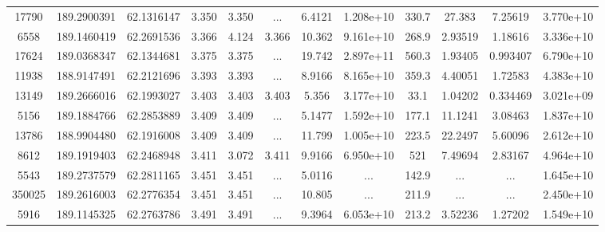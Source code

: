 \begin{table*}
\begin{tabular}{cccccccccccc}
          17790 &     189.2900391 &      62.1316147 &           3.350 &           3.350 &             ... &          6.4121 &       1.208e+10 &           330.7 &          27.383 &         7.25619 &       3.770e+10 \\
           6558 &     189.1460419 &      62.2691536 &           3.366 &           4.124 &           3.366 &          10.362 &       9.161e+10 &           268.9 &         2.93519 &         1.18616 &       3.336e+10 \\
          17624 &     189.0368347 &      62.1344681 &           3.375 &           3.375 &             ... &          19.742 &       2.897e+11 &           560.3 &         1.93405 &        0.993407 &       6.790e+10 \\
          11938 &     188.9147491 &      62.2121696 &           3.393 &           3.393 &             ... &          8.9166 &       8.165e+10 &           359.3 &         4.40051 &         1.72583 &       4.383e+10 \\
          13149 &     189.2666016 &      62.1993027 &           3.403 &           3.403 &           3.403 &           5.356 &       3.177e+10 &            33.1 &         1.04202 &        0.334469 &       3.021e+09 \\
           5156 &     189.1884766 &      62.2853889 &           3.409 &           3.409 &             ... &          5.1477 &       1.592e+10 &           177.1 &         11.1241 &         3.08463 &       1.837e+10 \\
          13786 &     188.9904480 &      62.1916008 &           3.409 &           3.409 &             ... &          11.799 &       1.005e+10 &           223.5 &         22.2497 &         5.60096 &       2.612e+10 \\
           8612 &     189.1919403 &      62.2468948 &           3.411 &           3.072 &           3.411 &          9.9166 &       6.950e+10 &             521 &         7.49694 &         2.83167 &       4.964e+10 \\
           5543 &     189.2737579 &      62.2811165 &           3.451 &           3.451 &             ... &          5.0116 &             ... &           142.9 &             ... &             ... &       1.645e+10 \\
         350025 &     189.2616003 &      62.2776354 &           3.451 &           3.451 &             ... &          10.805 &             ... &           211.9 &             ... &             ... &       2.450e+10 \\
           5916 &     189.1145325 &      62.2763786 &           3.491 &           3.491 &             ... &          9.3964 &       6.053e+10 &           213.2 &         3.52236 &         1.27202 &       1.549e+10 \\

\end{tabular}
\end{table*}
